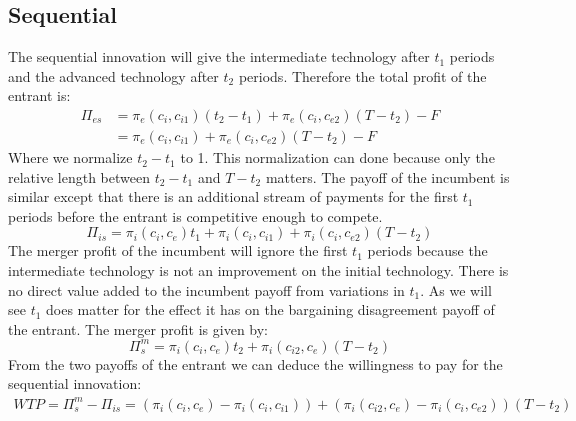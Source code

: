 \subsection{Sequential}
The sequential innovation will give the intermediate technology after $t_1$ periods and the advanced technology after $t_2$ periods. Therefore the total profit of the entrant is: 
\begin{align*}
\Pi_{es} &= \pi_e(c_i,c_{i1}) (t_2-t_1) +\pi_e(c_i,c_{e2})(T-t_2)-F \\
&= \pi_e(c_i,c_{i1}) +\pi_e(c_i,c_{e2})(T-t_2)-F
\end{align*}
Where we normalize $t_2-t_1$ to 1. This normalization can done because only the relative length between $t_2-t_1$ and $T-t_2$ matters. The payoff of the incumbent is similar except that there is an additional stream of payments for the first $t_1$ periods before the entrant is competitive enough to compete. 
\begin{equation*}
\Pi_{is} = \pi_i(c_i,c_{e})t_1+\pi_i(c_i,c_{i1}) +\pi_i(c_i,c_{e2})(T-t_2)
\end{equation*}
The merger profit of the incumbent will ignore the first $t_1$ periods because the intermediate technology is not an improvement on the initial technology. There is no direct value added to the incumbent payoff from variations in $t_1$. As we will see $t_1$ does matter for the effect it has on the bargaining disagreement payoff of the entrant. The merger profit is given by: 
\begin{equation*}
\Pi_{s}^m= \pi_i(c_i,c_{e}) t_2+\pi_i(c_{i2},c_e)(T-t_2)
\end{equation*}
From the two payoffs of the entrant we can deduce the willingness to pay for the sequential innovation: 
\begin{align*}
WTP=\Pi_{s}^m-\Pi_{is} = (\pi_i(c_i,c_{e})-\pi_i(c_i,c_{i1}))+(\pi_i(c_{i2},c_e)-\pi_i(c_{i},c_{e2}))(T-t_2) \\
\end{align*}
